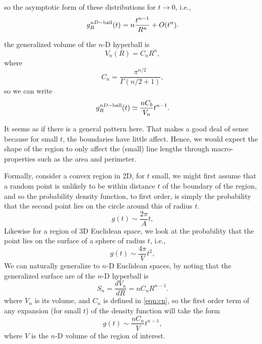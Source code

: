 \documentclass{article}
\begin{document}
so  the asymptotic form of these distributions for $t
\rightarrow 0$, i.e., 
\begin{equation}
  \label{eq:asympt_line_picking}
  g^{nD-{\rm ball}}_R(t) = n \frac{t^{n-1}}{R^n} + O(t^{n}).
\end{equation}

the generalized volume of the $n$-D hyperball is
\[ V_n(R) = C_n R^n, \]
where
\begin{equation}
  \label{eq:cn}
   C_n = \frac{ \pi^{n/2} }{\Gamma(n/2 + 1)},
\end{equation}
so we can write
\begin{equation}
  \label{eq:asympt_line_picking}
  g^{nD-{\rm ball}}_R(t) \simeq  \frac{n C_b}{V_n} t^{n-1}.
\end{equation}



 






It seems as if there is a general pattern here.  That makes a good
deal of sense because for small $t$, the boundaries have little
affect. Hence, we would expect the shape of the region to only affect
the (small) line lengths through macro-properties such as the area and
perimeter.

Formally, consider a convex region in 2D, for $t$ small, we might
first assume that a random point is unlikely to be within distance $t$
of the boundary of the region, and so the probability density
function, to first order, is simply the probability that the second
point lies on the circle around this of radius $t$.
\begin{equation}
  g(t) \sim \frac{2 \pi}{A} t, 
\end{equation}
Likewise for a region of 3D Euclidean space, we look at the
probability that the point lies on the surface of a sphere of radius
$t$, i.e.,
\begin{equation}
  g(t) \sim \frac{4 \pi}{V} t^2, 
\end{equation}
We can naturally generalize to $n$-D Euclidean spaces, by noting that
the generalized surface are of the $n$-D hyperball is
\begin{equation}
  \label{eq:surface_hyperball}
  S_{n} = \frac{dV_n}{dR} = n C_n R^{n-1}.
\end{equation}
where $V_n$ is its volume, and $C_n$ is defined in \eqref{eqn:cn}, so
the first order term of any expansion (for small $t$) of the density
function will take the form
\begin{equation}
  g(t) \sim \frac{n C_n}{V} t^{n-1}, 
\end{equation}
where $V$ is the $n$-D volume of the region of interest.
\end{document}
